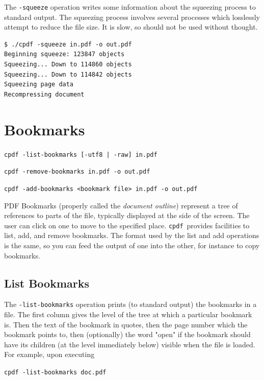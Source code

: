\documentclass[a4paper,makeidx]{memoir}
\newcommand{\cpdf}{\texttt{cpdf}}
\begin{document}
  The \texttt{-squeeze} operation writes some information about the squeezing process to standard output. The squeezing process involves several processes which losslessly attempt to reduce the file size. It is slow, so should not be used without thought.

\begin{verbatim}
$ ./cpdf -squeeze in.pdf -o out.pdf
Beginning squeeze: 123847 objects
Squeezing... Down to 114860 objects
Squeezing... Down to 114842 objects
Squeezing page data
Recompressing document
\end{verbatim}

\chapter{Bookmarks}
  \begin{framed}
  \small\noindent\verb!cpdf -list-bookmarks [-utf8 | -raw] in.pdf!

  \vspace{1.5mm}
  \small\noindent\verb!cpdf -remove-bookmarks in.pdf -o out.pdf!

  \vspace{1.5mm}
  \small\noindent\verb!cpdf -add-bookmarks <bookmark file> in.pdf -o out.pdf!

  \end{framed}
  PDF Bookmarks (properly called the \textit{document outline}) represent a tree
of references to parts of the file, typically displayed at the side of the
screen. The user can click on one to move to the specified place. \cpdf\ provides
facilities to list, add, and remove bookmarks. The format used by the list and
add operations is the same, so you can feed the output of one into the other,
for instance to copy bookmarks.

  \section{List Bookmarks}
  The \texttt{-list-bookmarks} operation prints (to standard output) the
bookmarks in a file. The first column gives the level of the tree at which a
particular bookmark is. Then the text of the bookmark in quotes, then the page
number which the bookmark points to, then (optionally) the word "open" if the
bookmark should have its children (at the level immediately below) visible when
the file is loaded. For example, upon executing
\begin{framed}
  \small\verb!cpdf -list-bookmarks doc.pdf!
\end{framed}
\end{document}
